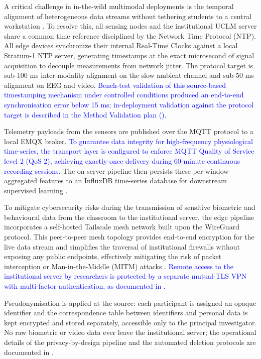 A critical challenge in in-the-wild multimodal deployments is the temporal alignment of heterogeneous data streams without tethering students to a central workstation \parencite{martinez-maldonado_lessons_2024}. To resolve this, all sensing nodes and the institutional UCLM server share a common time reference disciplined by the Network Time Protocol (NTP). All edge devices synchronize their internal Real-Time Clocks against a local Stratum-1 NTP server, generating timestamps at the exact microsecond of signal acquisition to decouple measurements from network jitter. The protocol target is sub-100 ms inter-modality alignment on the slow ambient channel and sub-50 ms alignment on EEG and video. \textcolor{blue}{Bench-test validation of this source-based timestamping mechanism under controlled conditions produced an end-to-end synchronisation error below 15 ms; in-deployment validation against the protocol target is described in the Method Validation plan ().}

Telemetry payloads from the sensors are published over the MQTT protocol to a local EMQX broker. \textcolor{blue}{To guarantee data integrity for high-frequency physiological time-series, the transport layer is configured to enforce MQTT Quality of Service level 2 (QoS 2), achieving exactly-once delivery during 60-minute continuous recording sessions.} The on-server pipeline then persists these per-window aggregated features to an InfluxDB time-series database for downstream supervised learning \parencite{Mishra2020_mqtt, Shi2016_edge}.

To mitigate cybersecurity risks during the transmission of sensitive biometric and behavioural data from the classroom to the institutional server, the edge pipeline incorporates a self-hosted Tailscale mesh network built upon the WireGuard protocol. This peer-to-peer mesh topology provides end-to-end encryption for the live data stream and simplifies the traversal of institutional firewalls without exposing any public endpoints, effectively mitigating the risk of packet interception or Man-in-the-Middle (MITM) attacks \parencite{alrashdi_ad-iot_2019}. \textcolor{blue}{Remote access to the institutional server by researchers is protected by a separate mutual-TLS VPN with multi-factor authentication, as documented in .}

Pseudonymisation is applied at the source: each participant is assigned an opaque identifier and the correspondence table between identifiers and personal data is kept encrypted and stored separately, accessible only to the principal investigator. No raw biometric or video data ever leave the institutional server; the operational details of the privacy-by-design pipeline and the automated deletion protocols are documented in .

